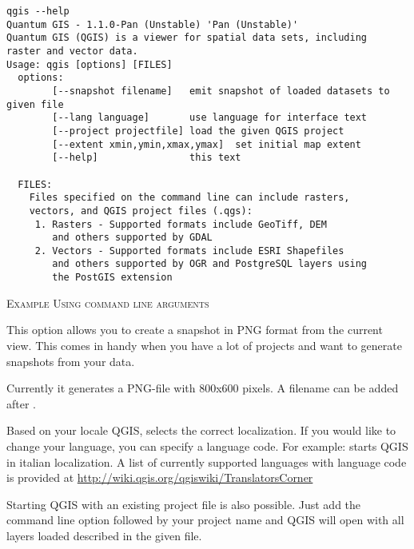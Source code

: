 \small
\begin{verbatim}
qgis --help
Quantum GIS - 1.1.0-Pan (Unstable) 'Pan (Unstable)'
Quantum GIS (QGIS) is a viewer for spatial data sets, including
raster and vector data.
Usage: qgis [options] [FILES]
  options:
        [--snapshot filename]   emit snapshot of loaded datasets to given file
        [--lang language]       use language for interface text
        [--project projectfile] load the given QGIS project
        [--extent xmin,ymin,xmax,ymax]  set initial map extent
        [--help]                this text

  FILES:
    Files specified on the command line can include rasters,
    vectors, and QGIS project files (.qgs):
     1. Rasters - Supported formats include GeoTiff, DEM
        and others supported by GDAL
     2. Vectors - Supported formats include ESRI Shapefiles
        and others supported by OGR and PostgreSQL layers using
        the PostGIS extension
\end{verbatim}
\normalsize

\begin{Tip} \caption{\textsc{Example Using command line arguments}}
\end{Tip}

This option allows you to create a snapshot in PNG format from the current view.
This comes in handy when you have a lot of projects and want to 
generate snapshots from your data.

Currently it generates a PNG-file with 800x600 pixels. A filename can be added after
.

Based on your locale QGIS, selects the correct localization. If you would like 
to change your language, you can specify a language code. For example: 
starts QGIS in italian localization. A list of currently supported
languages with language code is provided at
\url{http://wiki.qgis.org/qgiswiki/TranslatorsCorner} 

Starting QGIS with an existing project file is also possible. Just
add the command line option  followed by your project
name and QGIS will open with all layers loaded described in the given file.

